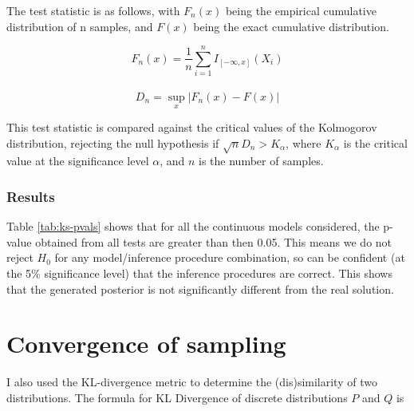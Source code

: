 The test statistic is as follows, with $F_n(x)$ being the empirical cumulative distribution of n samples, and $F(x)$ being the exact cumulative distribution.

$$F_{n}(x)=\frac{1}{n}\sum_{i=1}^{n}I_{[-\infty ,x]}(X_{i})$$\\
$$D_{n}=\sup_{x}|F_{n}(x)-F(x)|$$

This test statistic is compared against the critical values of the Kolmogorov distribution, rejecting the null hypothesis if $\sqrt{n}D_n > K_\alpha$, where $K_\alpha$ is the critical value at the significance level $\alpha$, and $n$ is the number of samples.

\subsubsection{Results}

Table \ref{tab:ks-pvals} shows that for all the continuous models considered, the p-value obtained from all tests are greater than then 0.05. This means we do not reject $H_0$ for any model/inference procedure combination, so can be confident (at the 5\% significance level) that the inference procedures are correct. This shows that the generated posterior is not significantly different from the real solution.

\begin{table}[!ht]
	\centering
	\caption{p-values of K-S test on different models using different inference procedures}
	\label{tab:ks-pvals}
\end{table}


\section{Convergence of sampling}
I also used the KL-divergence metric to determine the (dis)similarity of two distributions. The formula for KL Divergence of discrete distributions $P$ and $Q$ is

